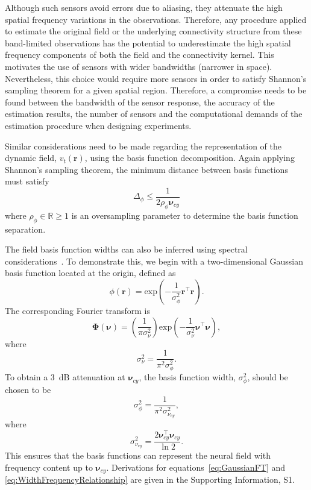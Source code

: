 \documentclass[12pt]{iopart}
\begin{document}
Although such sensors avoid errors due to aliasing, they attenuate the high spatial frequency variations in the observations. Therefore, any procedure applied to estimate the original field or the underlying connectivity structure from these band-limited observations has the potential to underestimate the high spatial frequency components of both the field and the connectivity kernel. This motivates the use of sensors with wider bandwidths (narrower in space). Nevertheless, this choice would require more sensors in order to satisfy Shannon's sampling theorem for a given spatial region. Therefore, a compromise needs to be found between the bandwidth of the sensor response, the accuracy of the estimation results, the number of sensors and the computational demands of the estimation procedure when designing experiments.

Similar considerations need to be made regarding the representation of the dynamic field, $v_t(\mathbf{r})$, using the basis function decomposition. Again applying Shannon's sampling theorem, the minimum distance between basis functions must satisfy 
\begin{equation}\label{eq:BasisFunctionSeparation}
	\Delta_{\phi} \leq \frac{1}{2\rho_{\phi}\boldsymbol{\nu}_{cy}}
\end{equation}
where $\rho_{\phi} \in \mathbb{R} \ge 1$ is an oversampling parameter to determine the basis function separation. 

The field basis function widths can also be inferred using spectral considerations~\cite{Sanner1992,Scerri2009}. To demonstrate this, we begin with a two-dimensional Gaussian basis function located at the origin, defined as
\begin{equation}\label{eq:BasisFunctionAtOrigin}
 \phi(\mathbf r)=\mathrm{exp}\left({-\frac{1}{\sigma_{\phi}^2} \mathbf r^\top\mathbf r}\right).
\end{equation}
The corresponding Fourier transform is
\begin{equation}\label{eq:GaussianFT}
\boldsymbol\Phi(\boldsymbol \nu)=\left(\frac{1}{\pi\sigma_{\nu}^2}\right)\mathrm{exp}\left(-\frac{1}{\sigma_{\nu}^2}\boldsymbol\nu^\top \boldsymbol\nu\right),
\end{equation}
where 
\begin{equation}\label{eq:GaussianFTWidth}
	\sigma^2_{\nu} = \frac{1}{\pi^2\sigma_{\phi}^2}. 
\end{equation}
To obtain a 3~dB attenuation at $\boldsymbol\nu_{cy}$, the basis function width, $\sigma^2_{\phi}$, should be chosen to be
\begin{equation}\label{eq:WidthCutOffRelationship}
 \sigma^2_{\phi}= \frac{1}{\pi^2\sigma_{\nu_{cy}}^2},
\end{equation}
where
\begin{equation}\label{eq:WidthFrequencyRelationship}
 \sigma^2_{\nu_{cy}}= \frac{2\boldsymbol\nu_{cy}^\top \boldsymbol\nu_{cy}}{\ln2}.
\end{equation}
This ensures that the basis functions can represent the neural field with frequency content up to $\boldsymbol\nu_{cy}$. Derivations for equations~\ref{eq:GaussianFT} and \ref{eq:WidthFrequencyRelationship} are given in the Supporting Information, S1.
\end{document}
